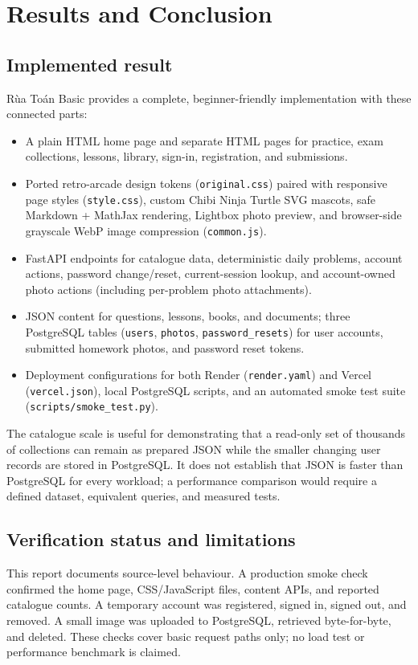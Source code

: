 \section{Results and Conclusion}
\subsection{Implemented result}
Rùa Toán Basic provides a complete, beginner-friendly implementation with these connected parts:
\begin{itemize}
  \item A plain HTML home page and separate HTML pages for practice, exam collections, lessons, library, sign-in, registration, and submissions.
  \item Ported retro-arcade design tokens (\texttt{original.css}) paired with responsive page styles (\texttt{style.css}), custom Chibi Ninja Turtle SVG mascots, safe Markdown + MathJax rendering, Lightbox photo preview, and browser-side grayscale WebP image compression (\texttt{common.js}).
  \item FastAPI endpoints for catalogue data, deterministic daily problems, account actions, password change/reset, current-session lookup, and account-owned photo actions (including per-problem photo attachments).
  \item JSON content for questions, lessons, books, and documents; three PostgreSQL tables (\texttt{users}, \texttt{photos}, \texttt{password\_resets}) for user accounts, submitted homework photos, and password reset tokens.
  \item Deployment configurations for both Render (\texttt{render.yaml}) and Vercel (\texttt{vercel.json}), local PostgreSQL scripts, and an automated smoke test suite (\texttt{scripts/smoke\_test.py}).
\end{itemize}
The catalogue scale is useful for demonstrating that a read-only set of thousands of collections can remain as prepared JSON while the smaller changing user records are stored in PostgreSQL. It does not establish that JSON is faster than PostgreSQL for every workload; a performance comparison would require a defined dataset, equivalent queries, and measured tests.

\subsection{Verification status and limitations}
This report documents source-level behaviour. A production smoke check confirmed the home page, CSS/JavaScript files, content APIs, and reported catalogue counts. A temporary account was registered, signed in, signed out, and removed. A small image was uploaded to PostgreSQL, retrieved byte-for-byte, and deleted. These checks cover basic request paths only; no load test or performance benchmark is claimed.

